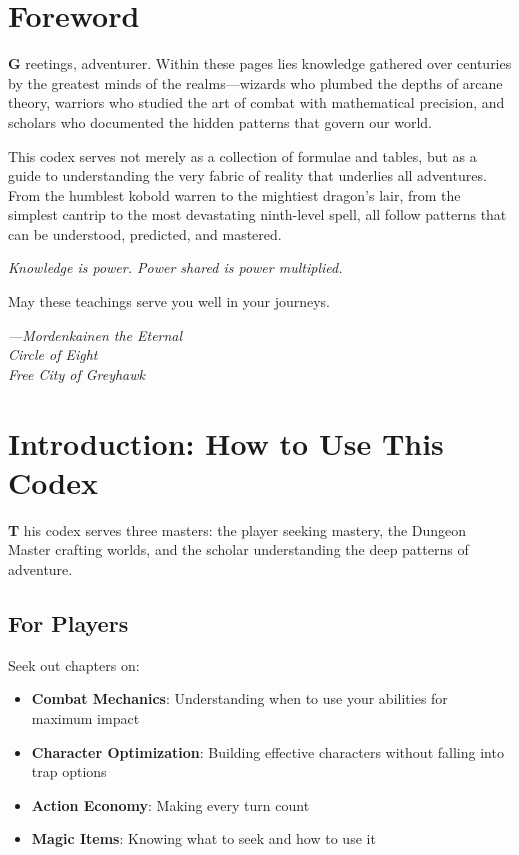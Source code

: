 \documentclass[11pt,letterpaper,openany]{book}
\newcommand{\firstletter}[1]{%
    \textcolor{bloodred}{\fontsize{48}{48}\selectfont\bfseries #1}%
}
\begin{document}
\raggedbottom

\frontmatter
\chapter*{Foreword}

\firstletter{G}reetings, adventurer. Within these pages lies knowledge gathered over centuries by the greatest minds of the realms—wizards who plumbed the depths of arcane theory, warriors who studied the art of combat with mathematical precision, and scholars who documented the hidden patterns that govern our world.

This codex serves not merely as a collection of formulae and tables, but as a guide to understanding the very fabric of reality that underlies all adventures. From the humblest kobold warren to the mightiest dragon's lair, from the simplest cantrip to the most devastating ninth-level spell, all follow patterns that can be understood, predicted, and mastered.

\begin{center}
\textit{Knowledge is power. Power shared is power multiplied.}
\end{center}

May these teachings serve you well in your journeys.

\begin{flushright}
\textit{—Mordenkainen the Eternal}\\  
\textit{Circle of Eight}\\  
\textit{Free City of Greyhawk}
\end{flushright}

\chapter*{Introduction: How to Use This Codex}

\firstletter{T}his codex serves three masters: the player seeking mastery, the Dungeon Master crafting worlds, and the scholar understanding the deep patterns of adventure.

\section*{For Players}

Seek out chapters on:
\begin{itemize}
    \item \textbf{Combat Mechanics}: Understanding when to use your abilities for maximum impact
    \item \textbf{Character Optimization}: Building effective characters without falling into trap options
    \item \textbf{Action Economy}: Making every turn count
    \item \textbf{Magic Items}: Knowing what to seek and how to use it
\end{itemize}
\end{document}
